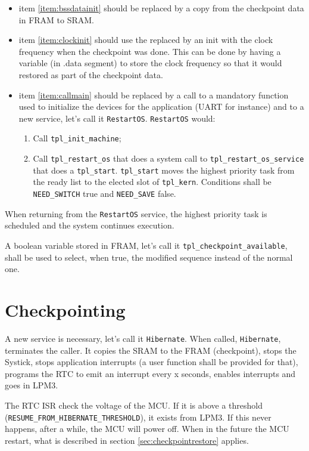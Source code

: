 \documentclass[11pt, oneside]{article}   	%
\begin{document}
\begin{itemize}
\item item \ref{item:bssdatainit} should be replaced by a copy from the checkpoint data in FRAM to SRAM.
\item item \ref{item:clockinit} should use the replaced by an init with the clock frequency when the checkpoint was done. This can be done by having a variable (in .data segment) to store the clock frequency so that it would restored as part of the checkpoint data.
\item item \ref{item:callmain} should be replaced by a call to a mandatory function used to initialize the devices for the application (UART for instance) and to a new service, let's call it \lstinline{RestartOS}. \lstinline{RestartOS} would:
	\begin{enumerate}
	\item Call \lstinline{tpl_init_machine};
	\item Call \lstinline{tpl_restart_os} that does a system call to \lstinline{tpl_restart_os_service} that does a \lstinline{tpl_start}. \lstinline{tpl_start} moves the highest priority task from the ready list to the elected slot of \lstinline{tpl_kern}. Conditions shall be \lstinline{NEED_SWITCH} true and \lstinline{NEED_SAVE} false.  
	\end{enumerate}
\end{itemize}

When returning from the \lstinline{RestartOS} service, the highest priority task is scheduled and the system continues execution.

A boolean variable stored in FRAM, let's call it \lstinline{tpl_checkpoint_available}, shall be used to select, when true, the modified sequence instead of the normal one.

\section{Checkpointing}\label{sec:checkpointing}

A new service is necessary, let's call it \lstinline{Hibernate}. When called, \lstinline{Hibernate}, terminates the caller. It copies the SRAM to the FRAM (checkpoint), stops the Systick, stops application interrupts (a user function shall be provided for that), programs the RTC to emit an interrupt every x seconds, enables interrupts and goes in LPM3. 

The RTC ISR check the voltage of the MCU. If it is above a threshold (\lstinline{RESUME_FROM_}\-\lstinline{HIBERNATE_THRESHOLD}), it exists from LPM3. If this never happens, after a while, the MCU will power off. When in the future the MCU restart, what is described in section \ref{sec:checkpointrestore} applies.  
\end{document}
